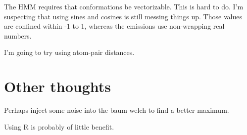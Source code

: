 \documentclass[10pt]{article}
\begin{document}
The HMM requires that conformations be vectorizable. This is hard to do. I'm suspecting
that using sines and cosines is still messing things up. Those values are confined within
-1 to 1, whereas the emissions use non-wrapping real numbers.

I'm going to try using atom-pair distances.

\section{Other thoughts}

Perhaps inject some noise into the baum welch to find a better maximum.

Using R is probably of little benefit.
\end{document}
